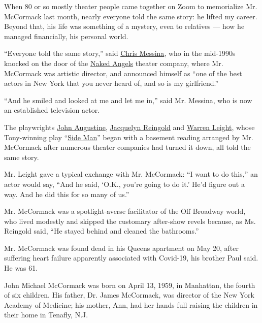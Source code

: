 When 80 or so mostly theater people came together on Zoom to memorialize
Mr. McCormack last month, nearly everyone told the same story: he lifted
my career. Beyond that, his life was something of a mystery, even to
relatives --- how he managed financially, his personal world.

``Everyone told the same story,'' said
\href{https://www.thecut.com/2020/02/why-chris-messina-should-be-on-the-chris-list.html}{Chris
Messina}, who in the mid-1990s knocked on the door of the
\href{https://www.nakedangels.com/}{Naked Angels} theater company, where
Mr. McCormack was artistic director, and announced himself as ``one of
the best actors in New York that you never heard of, and so is my
girlfriend.''

``And he smiled and looked at me and let me in,'' said Mr. Messina, who
is now an established television actor.

The playwrights
\href{https://www.broadwayworld.com/bwwbooks/article/Christopher-Durang-and-John-Augustine-Announced-as-Playwrights-in-Residence-at-Texas-State-20130904}{John
Augustine}, \href{https://www.jacquelynreingold.com/}{Jacquelyn
Reingold} and
\href{https://lawandorder.fandom.com/wiki/Warren_Leight}{Warren Leight},
whose Tony-winning play
``\href{https://www.nytimes3xbfgragh.onion/1998/11/09/theater/theater-review-a-new-drama-on-broadway-and-a-new-son-in-turmoil.html}{Side
Man}'' began with a basement reading arranged by Mr. McCormack after
numerous theater companies had turned it down, all told the same story.

Mr. Leight gave a typical exchange with Mr. McCormack: ``I want to do
this,'' an actor would say, ``And he said, `O.K., you're going to do
it.' He'd figure out a way. And he did this for so many of us.''

Mr. McCormack was a spotlight-averse facilitator of the Off Broadway
world, who lived modestly and skipped the customary after-show revels
because, as Ms. Reingold said, ``He stayed behind and cleaned the
bathrooms.''

Mr. McCormack was found dead in his Queens apartment on May 20, after
suffering heart failure apparently associated with Covid-19, his brother
Paul said. He was 61.

John Michael McCormack was born on April 13, 1959, in Manhattan, the
fourth of six children. His father, Dr. James McCormack, was director of
the New York Academy of Medicine; his mother, Ann, had her hands full
raising the children in their home in Tenafly, N.J.


